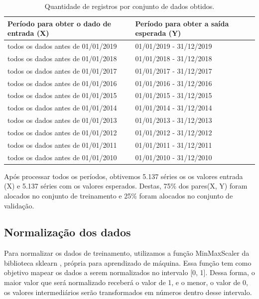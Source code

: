 \begin{table}[H]
\centering
\caption{Quantidade de registros por conjunto de dados obtidos.}
\label{tab:dados_de_treinament_lstm}
\begin{adjustbox}{width=\textwidth}
\begin{tabular}{|l|l|}
\hline
\textbf{Período para obter o dado de entrada (X)} & \textbf{Período para obter a saída esperada (Y)}\\
\hline
todos os dados antes de 01/01/2019  & 01/01/2019 - 31/12/2019 \\
\hline
todos os dados antes de 01/01/2018  & 01/01/2018 - 31/12/2018 \\
\hline
todos os dados antes de 01/01/2017  & 01/01/2017 - 31/12/2017 \\
\hline
todos os dados antes de 01/01/2016  & 01/01/2016 - 31/12/2016 \\
\hline
todos os dados antes de 01/01/2015  & 01/01/2015 - 31/12/2015 \\
\hline
todos os dados antes de 01/01/2014  & 01/01/2014 - 31/12/2014 \\
\hline
todos os dados antes de 01/01/2013  & 01/01/2013 - 31/12/2013 \\
\hline
todos os dados antes de 01/01/2012  & 01/01/2012 - 31/12/2012 \\
\hline
todos os dados antes de 01/01/2011  & 01/01/2011 - 31/12/2011 \\
\hline
todos os dados antes de 01/01/2010  & 01/01/2010 - 31/12/2010 \\
\hline
\end{tabular}
\end{adjustbox}
\end{table}

Após processar todos os períodos, obtivemos 5.137 séries os os valores  entrada (X) e 5.137 séries com os valores esperados. Destas, 75\% dos pares(X, Y) foram alocados no conjunto de treinamento e 25\% foram alocados no conjunto de validação.  


\subsection{Normalização dos dados}

Para normalizar os dados de treinamento, utilizamos a função MinMaxScaler da biblioteca sklearn \cite{pedregosa2011scikit}, própria para aprendizado de máquina. Essa função tem como objetivo mapear os dados a serem normalizados no intervalo [0, 1]. Dessa forma, o maior valor que será normalizado receberá o valor de 1, e o menor, o valor de 0, os valores intermediários serão transformados em números dentro desse intervalo.

